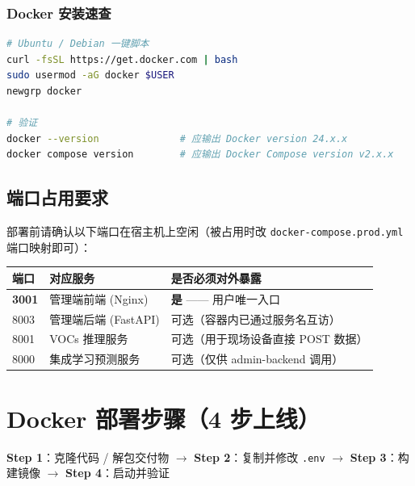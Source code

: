 \documentclass[UTF8,a4paper,11pt]{ctexart}
\begin{document}
\subsubsection{Docker 安装速查}

\begin{lstlisting}[language=bash]
# Ubuntu / Debian 一键脚本
curl -fsSL https://get.docker.com | bash
sudo usermod -aG docker $USER
newgrp docker

# 验证
docker --version              # 应输出 Docker version 24.x.x
docker compose version        # 应输出 Docker Compose version v2.x.x
\end{lstlisting}

\subsection{端口占用要求}

部署前请确认以下端口在宿主机上空闲（被占用时改 \texttt{docker-compose.prod.yml} 端口映射即可）：

\begin{longtable}{L{2.0cm} L{4.5cm} L{6.5cm}}
\toprule
\textbf{端口} & \textbf{对应服务} & \textbf{是否必须对外暴露} \\
\midrule
\endhead
\textbf{3001} & 管理端前端 (Nginx)         & \textbf{是} —— 用户唯一入口 \\
8003          & 管理端后端 (FastAPI)        & 可选（容器内已通过服务名互访） \\
8001          & VOCs 推理服务              & 可选（用于现场设备直接 POST 数据） \\
8000          & 集成学习预测服务            & 可选（仅供 admin-backend 调用） \\
\bottomrule
\end{longtable}

\section{Docker 部署步骤（4 步上线）}

\begin{successbox}[流程总览]
\textbf{Step 1}：克隆代码 / 解包交付物 \quad$\rightarrow$\quad
\textbf{Step 2}：复制并修改 \texttt{.env} \quad$\rightarrow$\quad
\textbf{Step 3}：构建镜像 \quad$\rightarrow$\quad
\textbf{Step 4}：启动并验证
\end{successbox}
\end{document}
